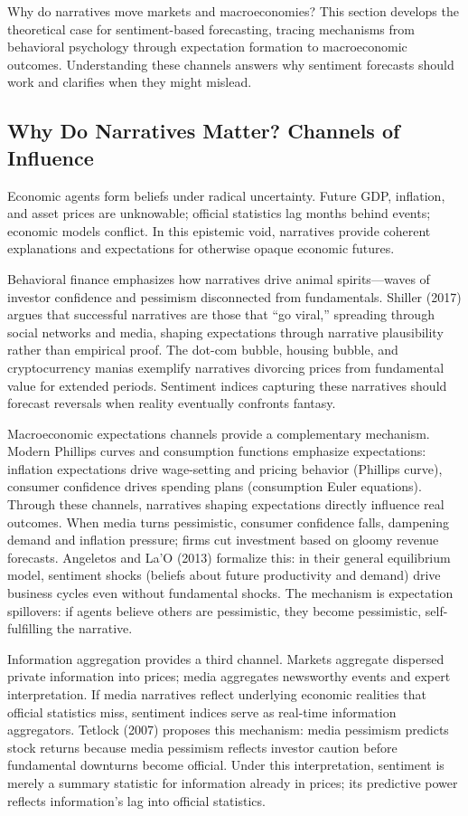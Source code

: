 \documentclass[11pt]{article}
\begin{document}
Why do narratives move markets and macroeconomies? This section develops the theoretical case for sentiment-based forecasting, tracing mechanisms from behavioral psychology through expectation formation to macroeconomic outcomes. Understanding these channels answers why sentiment forecasts should work and clarifies when they might mislead.

\subsection{Why Do Narratives Matter? Channels of Influence}

Economic agents form beliefs under radical uncertainty. Future GDP, inflation, and asset prices are unknowable; official statistics lag months behind events; economic models conflict. In this epistemic void, narratives provide coherent explanations and expectations for otherwise opaque economic futures.

Behavioral finance emphasizes how narratives drive animal spirits---waves of investor confidence and pessimism disconnected from fundamentals. Shiller (2017) argues that successful narratives are those that ``go viral,'' spreading through social networks and media, shaping expectations through narrative plausibility rather than empirical proof. The dot-com bubble, housing bubble, and cryptocurrency manias exemplify narratives divorcing prices from fundamental value for extended periods. Sentiment indices capturing these narratives should forecast reversals when reality eventually confronts fantasy.

Macroeconomic expectations channels provide a complementary mechanism. Modern Phillips curves and consumption functions emphasize expectations: inflation expectations drive wage-setting and pricing behavior (Phillips curve), consumer confidence drives spending plans (consumption Euler equations). Through these channels, narratives shaping expectations directly influence real outcomes. When media turns pessimistic, consumer confidence falls, dampening demand and inflation pressure; firms cut investment based on gloomy revenue forecasts. Angeletos and La'O (2013) formalize this: in their general equilibrium model, sentiment shocks (beliefs about future productivity and demand) drive business cycles even without fundamental shocks. The mechanism is expectation spillovers: if agents believe others are pessimistic, they become pessimistic, self-fulfilling the narrative.

Information aggregation provides a third channel. Markets aggregate dispersed private information into prices; media aggregates newsworthy events and expert interpretation. If media narratives reflect underlying economic realities that official statistics miss, sentiment indices serve as real-time information aggregators. Tetlock (2007) proposes this mechanism: media pessimism predicts stock returns because media pessimism reflects investor caution before fundamental downturns become official. Under this interpretation, sentiment is merely a summary statistic for information already in prices; its predictive power reflects information's lag into official statistics.
\end{document}
